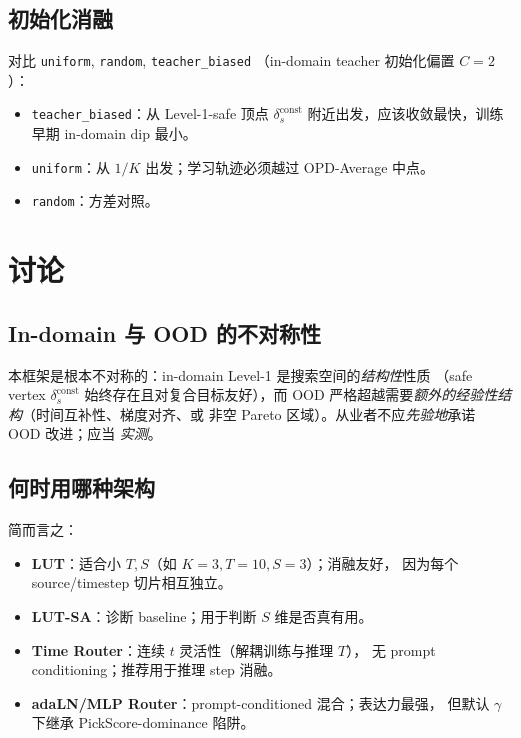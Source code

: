 \documentclass[11pt,a4paper]{article}
\newcommand{\const}{\mathrm{const}}
\theoremstyle{definition}
\begin{document}
\subsection{初始化消融}

对比 \texttt{uniform}, \texttt{random}, \texttt{teacher\_biased}
（in-domain teacher 初始化偏置 $C\!=\!2$）：
\begin{itemize}[leftmargin=1.5em]
\item \texttt{teacher\_biased}：从 Level-1-safe 顶点 $\delta_s^{\const}$
附近出发，应该收敛最快，训练早期 in-domain dip 最小。
\item \texttt{uniform}：从 $1/K$ 出发；学习轨迹必须越过 OPD-Average
中点。
\item \texttt{random}：方差对照。
\end{itemize}

\section{讨论}
\label{sec:discussion}

\subsection{In-domain 与 OOD 的不对称性}

本框架是根本不对称的：in-domain Level-1 是搜索空间的\emph{结构性}性质
（safe vertex $\delta_s^{\const}$ 始终存在且对复合目标友好），而 OOD
严格超越需要\emph{额外的经验性结构}（时间互补性、梯度对齐、或
非空 Pareto 区域）。从业者不应\emph{先验地}承诺 OOD 改进；应当
\emph{实测}。

\subsection{何时用哪种架构}

简而言之：
\begin{itemize}[leftmargin=1.5em]
\item \textbf{LUT}：适合小 $T, S$（如 $K=3, T=10, S=3$）；消融友好，
因为每个 source/timestep 切片相互独立。
\item \textbf{LUT-SA}：诊断 baseline；用于判断 $S$ 维是否真有用。
\item \textbf{Time Router}：连续 $t$ 灵活性（解耦训练与推理 $T$），
无 prompt conditioning；推荐用于推理 step 消融。
\item \textbf{adaLN/MLP Router}：prompt-conditioned 混合；表达力最强，
但默认 $\gamma$ 下继承 PickScore-dominance 陷阱。
\end{itemize}
\end{document}
